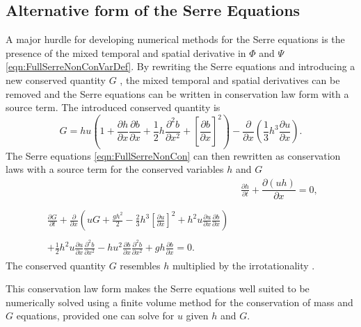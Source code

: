 \subsection{Alternative form of the Serre Equations}
A major hurdle for developing numerical methods for the Serre equations is the presence of the mixed temporal and spatial derivative in $\Phi$ and $\Psi$ \eqref{eqn:FullSerreNonConVarDef}. By rewriting the Serre equations and introducing a new conserved quantity $G$ \cite{Hank-etal-2010-2034,Zoppou-2014,Li-2014-169}, the mixed temporal and spatial derivatives can be removed and the Serre equations can be written in conservation law form with a source term. The introduced conserved quantity is
\begin{equation}
\label{defn:SerreEqnConservedQuantity1}
G =  h {u} \left(1 + \frac{\partial h}{\partial x}\frac{\partial b}{\partial x} + \frac{1}{2}h\frac{\partial^2 b}{\partial x^2} + \left[\frac{\partial b}{\partial x}\right]^2 \right) - \frac{\partial}{\partial x}\left(\frac{1}{3}h^3  \frac{\partial {u}}{\partial x}\right).
\end{equation}
The Serre equations \eqref{eqn:FullSerreNonCon} can then rewritten as conservation laws with a source term for the conserved variables $h$ and $G$
\begin{subequations}
	\label{eqn:FullSerreCon}
	\begin{align}
	& \frac{\partial h}{\partial t} + \dfrac{\partial (uh)}{\partial x} = 0 ,\label{eqn:FullSerreConMass}  \\ \nonumber \\
	\begin{split}
	\label{eqn:Serreconsconmom}
		\frac{\partial G}{\partial t}  + \frac{\partial}{\partial x} \left( {u} G + \frac{gh^2}{2} - \frac{2}{3}h^3 \left[\frac{\partial {u}}{\partial x}\right]^2 + h^2 {u}\frac{\partial {u}}{\partial x}\frac{\partial b}{\partial x} \right) \\ \\ + \frac{1}{2}h^2 {u} \frac{\partial {u}}{\partial x} \frac{\partial^2 b}{\partial x^2}  - h {u}^2\frac{\partial b}{\partial x}\frac{\partial^2 b}{\partial x^2} + gh\frac{\partial b}{\partial x} = 0.
	\end{split}
	\end{align}
\end{subequations}
The conserved quantity $G$ resembles $h$ multiplied by the irrotationality \cite{Choi-Camassa-1999-1,Carter-Cienfuegos-2011-259}.

This conservation law form makes the Serre equations well suited to be numerically solved using a finite volume method for the conservation of mass and $G$ equations, provided one can solve for $u$ given $h$ and $G$.

